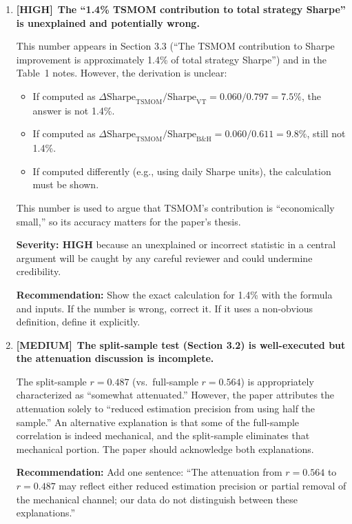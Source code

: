 \documentclass[12pt,a4paper]{article}
\newcommand{\HIGH}{\textcolor{highsev}{\textbf{[HIGH]}}}
\newcommand{\MEDIUM}{\textcolor{medsev}{\textbf{[MEDIUM]}}}
\begin{document}
\begin{enumerate}[label=\textbf{C.\arabic*}]

\item \HIGH\ \textbf{The ``1.4\% TSMOM contribution to total strategy Sharpe'' is unexplained and potentially wrong.}

This number appears in Section 3.3 (``The TSMOM contribution to Sharpe improvement is approximately 1.4\% of total strategy Sharpe'') and in the Table~1 notes. However, the derivation is unclear:

\begin{itemize}
\item If computed as $\Delta\text{Sharpe}_{\text{TSMOM}} / \text{Sharpe}_{\text{VT}} = 0.060 / 0.797 = 7.5\%$, the answer is not 1.4\%.
\item If computed as $\Delta\text{Sharpe}_{\text{TSMOM}} / \text{Sharpe}_{\text{B\&H}} = 0.060 / 0.611 = 9.8\%$, still not 1.4\%.
\item If computed differently (e.g., using daily Sharpe units), the calculation must be shown.
\end{itemize}

This number is used to argue that TSMOM's contribution is ``economically small,'' so its accuracy matters for the paper's thesis.

\textbf{Severity: HIGH} because an unexplained or incorrect statistic in a central argument will be caught by any careful reviewer and could undermine credibility.

\textbf{Recommendation:} Show the exact calculation for 1.4\% with the formula and inputs. If the number is wrong, correct it. If it uses a non-obvious definition, define it explicitly.


\item \MEDIUM\ \textbf{The split-sample test (Section 3.2) is well-executed but the attenuation discussion is incomplete.}

The split-sample $r = 0.487$ (vs.\ full-sample $r = 0.564$) is appropriately characterized as ``somewhat attenuated.'' However, the paper attributes the attenuation solely to ``reduced estimation precision from using half the sample.'' An alternative explanation is that some of the full-sample correlation is indeed mechanical, and the split-sample eliminates that mechanical portion. The paper should acknowledge both explanations.

\textbf{Recommendation:} Add one sentence: ``The attenuation from $r = 0.564$ to $r = 0.487$ may reflect either reduced estimation precision or partial removal of the mechanical channel; our data do not distinguish between these explanations.''



\end{enumerate}
\end{document}
